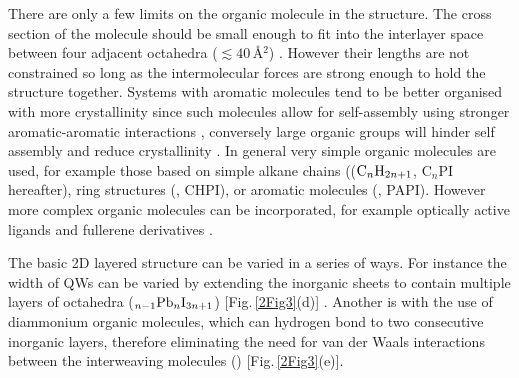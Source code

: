 There are only a few limits on the organic molecule  in the structure. The cross section of the molecule should be small enough to fit into the interlayer space between four adjacent octahedra ($\lesssim 40$\,\AA$^2$) \cite{Mitzi2001a}. However their lengths are not constrained so long as the intermolecular forces are strong enough to hold the structure together. Systems with aromatic molecules tend to be better organised with more crystallinity since such molecules allow for self-assembly using stronger aromatic-aromatic interactions \cite{Zhang2009}, conversely large organic groups will hinder self assembly and reduce crystallinity \cite{Zhang2009}. In general very simple organic molecules are used, for example those based on simple alkane chains (($\textnormal{C}_n\textnormal{H}_{2n+1}$, C$_n$PI hereafter), ring structures (, CHPI), or aromatic molecules (, PAPI). However more complex organic molecules can be incorporated, for example optically active ligands \cite{Billing2006, Teshima2003} and fullerene derivatives \cite{Kikuchi2005, Kawabata2009}. 

The basic 2D layered structure can be varied in a series of ways. For instance the width of QWs	can be varied by extending the inorganic sheets to contain multiple layers of  octahedra ($_{n-1}\textnormal{Pb}_n\textnormal{I}_{3n+1}$) [Fig.\,\ref{2Fig3}(d)] \cite{Calabrese1991}. Another is with the use of diammonium organic molecules, which can hydrogen bond to two consecutive inorganic layers, therefore eliminating the need for van der Waals interactions between the interweaving molecules () [Fig.\,\ref{2Fig3}(e)].


